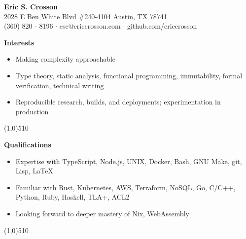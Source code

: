 \documentclass{report}
\newcommand{\cut}{\begin{center} \line(1,0){510} \end{center}}
\begin{document}
\pagestyle{empty}
\setlength\parindent{0pt}

\begin{center}
  \textbf{Eric S. Crosson} \\
  2028 E Ben White Blvd \#240-4104 Austin, TX 78741 \\
  (360) 820 - 8196 $\cdot$ esc@ericcrosson.com $\cdot$ github.com/ericcrosson
\end{center}

\textbf{Interests}
\begin{itemize}[label=$\cdot$]
\item Making complexity approachable
\item Type theory, static analysis, functional programming, immutability, formal verification, technical writing
\item Reproducible research, builds, and deployments; experimentation in production
\end{itemize}

\cut{}

\textbf{Qualifications}
\begin{itemize}[label=$\cdot$]
\item Expertise with TypeScript, Node.js, UNIX, Docker, Bash, GNU Make, git, Lisp, \LaTeX{}
\item Familiar with Rust, Kubernetes, AWS, Terraform, NoSQL, Go, C/C++, Python, Ruby, Haskell, TLA+, ACL2
\item Looking forward to deeper mastery of Nix, WebAssembly
\end{itemize}

\cut{}
\end{document}
